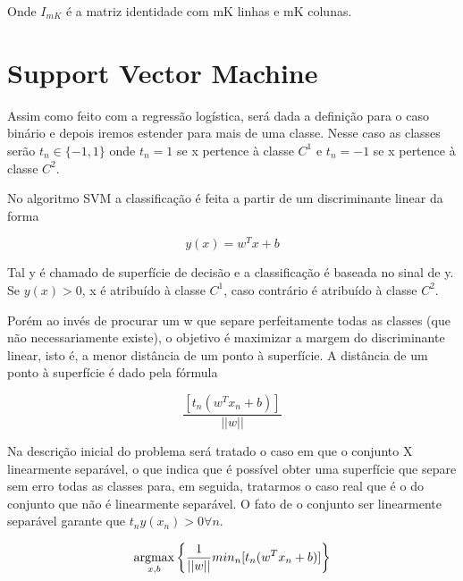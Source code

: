 Onde $I_{mK}$ é a matriz identidade com mK linhas e mK colunas.

\section{Support Vector Machine}

Assim como feito com a regressão logística, será dada a definição
para o caso binário e depois iremos estender para mais de uma classe. Nesse caso
as  classes serão $t_n \in \{-1, 1\}$ onde $t_n = 1$ se x pertence à classe $C^1$ e
$t_n = -1$ se x pertence à classe $C^2$.

No algoritmo SVM a classificação é feita a partir de um discriminante linear
da forma 

\begin{center}
	\begin{equation}\label{eq:svm-discriminant}
		y(x) = w^Tx + b
	\end{equation}
\end{center}

Tal y é chamado de superfície de decisão e a classificação é baseada no sinal de
y. Se $y(x) > 0$, x é atribuído à classe $C^1$, caso contrário é atribuído à classe
$C^2$.

Porém ao invés de procurar um w que separe perfeitamente todas as classes (que
não necessariamente existe), o objetivo é maximizar a margem do discriminante
linear, isto é, a menor distância de um ponto à superfície. A distância de um ponto à
superfície é dado pela fórmula

\begin{center}
	\begin{equation}
		\frac{[t_n(w^Tx_n + b)]}{||w||}
	\end{equation}
\end{center}
 
Na descrição inicial do problema será tratado o caso em que o conjunto X linearmente separável, 
o que indica que é possível obter uma superfície que separe sem erro todas as classes para, em
seguida, tratarmos o caso real que é o do conjunto que não é linearmente separável.
O fato de o conjunto ser linearmente separável garante que $t_ny(x_n) >0 \forall n$.


\begin{center}
	\begin{equation}
		\operatorname*{argmax}_{x, b} \left\{ \frac{1}{||w||} min_n [t_n(w^Tx_n + b)] \right\}
	\end{equation}
\end{center}


